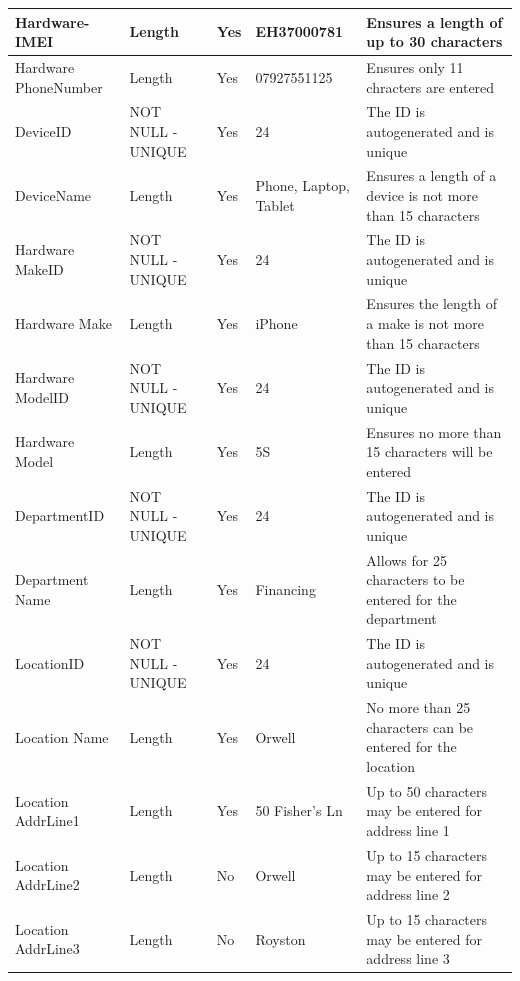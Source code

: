\begin{center}
\begin{longtable}{|p{2.5cm}|p{2cm}|p{3cm}|p{3cm}|p{3cm}|}
Hardware-IMEI               & Length              &Yes                     & EH37000781               & Ensures a length of up to 30 characters                      \\ \hline
Hardware PhoneNumber                  & Length            &Yes                      & 07927551125              &   Ensures only 11 chracters are entered                      \\ \hline
DeviceID                     & NOT NULL - UNIQUE             &Yes                       & 24                 & The ID is autogenerated and is unique                    \\ \hline
DeviceName                         & Length                       &Yes            & Phone, Laptop, Tablet                &  Ensures a length of a device is not more than 15 characters                     \\ \hline
Hardware MakeID                    & NOT NULL - UNIQUE       &Yes                             & 24                 & The ID is autogenerated and is unique                       \\ \hline
Hardware Make                        & Length               &Yes                    & iPhone                & Ensures the length of a make is not more than 15 characters                      \\ \hline
Hardware ModelID		& NOT NULL - UNIQUE                       &Yes             & 24                 & The ID is autogenerated and is unique                        \\ \hline
Hardware Model                      & Length            &Yes                       & 5S                    & Ensures no more than 15 characters will be entered                       \\ \hline
DepartmentID 	&NOT NULL - UNIQUE 	&Yes	& 24		& The ID is autogenerated and is unique	\\ \hline
Department Name	& Length	&Yes	& Financing		& Allows for 25 characters to be entered for the department	\\ \hline
LocationID 		&NOT NULL - UNIQUE 	&Yes	& 	24	& The ID is autogenerated and is unique		\\ \hline
Location Name	& Length	&Yes	&	Orwell	 & No more than 25 characters can be entered for the location  \\ \hline
Location AddrLine1 & Length	&Yes	&	50 Fisher's Ln	 & Up to 50 characters may be entered for address line 1  \\ \hline
Location AddrLine2 & Length	&No	&	Orwell	 & Up to 15 characters may be entered for address line 2 \\ \hline
Location AddrLine3  & Length	&No	&	Royston 	 &Up to 15 characters may be entered for address line 3  \\ \hline
    \end{longtable}
\end{center}

